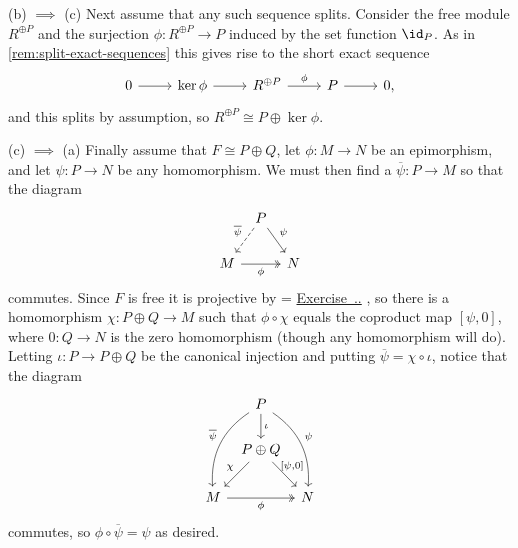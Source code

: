 \documentclass[article, a4paper, 11pt, oneside]{memoir}
\numberwithin{equation}{chapter}
\newcommand{\RNum}[1]{\uppercase\expandafter{\romannumeral #1\relax}}
\newcommand{\exref}[1]{%
    \setsepchar{.}%
    \readlist*\mylist{#1}%
    \ifnum \arabic{chapter}=\mylist[1]
        \def\mylabel{\mylist[2].\mylist[3]}%
    \else
        \def\mylabel{\RNum{\mylist[1]}.\mylist[2].\mylist[3]}%
    \fi
    \hyperref[ex:#1]{Exercise~\mylabel}%
}
\theoremstyle{nonumberplain}
\begin{document}
\begin{remarkbreak}
\begin{proofsec}
        \item[(b) $\implies$ (c)]
        Next assume that any such sequence splits. Consider the free module $R^{\oplus P}$ and the surjection $\phi \colon R^{\oplus P} \to P$ induced by the set function $\id_P$. As in \cref{rem:split-exact-sequences} this gives rise to the short exact sequence
        \begin{equation*}
            \begin{tikzcd}
                0 \ar[r]
                & \ker\phi \ar[r]
                & R^{\oplus P} \ar[r, "\phi"]
                & P \ar[r]
                & 0,
            \end{tikzcd}
        \end{equation*}
        and this splits by assumption, so $R^{\oplus P} \cong P \oplus \ker\phi$.

        \item[(c) $\implies$ (a)]
        Finally assume that $F \cong P \oplus Q$, let $\phi \colon M \to N$ be an epimorphism, and let $\psi \colon P \to N$ be any homomorphism. We must then find a $\overline{\psi} \colon P \to M$ so that the diagram
        \begin{equation*}
            \begin{tikzcd}[column sep=tiny]
                & P
                    \ar[dl, "\overline{\psi}", swap, dashed]
                    \ar[dr, "\psi"]
                \\
                M
                    \ar[rr, "\phi", swap, two heads]
                && N
            \end{tikzcd}
        \end{equation*}
        commutes. Since $F$ is free it is projective by \exref{3.6.9}, so there is a homomorphism $\chi \colon P \oplus Q \to M$ such that $\phi \circ \chi$ equals the coproduct map $[\psi, 0]$, where $0 \colon Q \to N$ is the zero homomorphism (though any homomorphism will do). Letting $\iota \colon P \to P \oplus Q$ be the canonical injection and putting $\overline{\psi} = \chi \circ \iota$, notice that the diagram
        \begin{equation*}
            \begin{tikzcd}[column sep=tiny]
                & P
                    \ar[d, "\iota"]
                    \ar[ddl, "\overline{\psi}", swap, bend right]
                    \ar[ddr, "\psi", bend left]
                \\
                & P \oplus Q
                    \ar[dl, "\chi", swap]
                    \ar[dr, "{[\psi, 0]}" {xshift=-5pt}]
                \\
                M
                    \ar[rr, "\phi", swap, two heads]
                && N
            \end{tikzcd}
        \end{equation*}
        commutes, so $\phi \circ \overline{\psi} = \psi$ as desired.
    \end{proofsec}
\end{remarkbreak}
\end{document}
